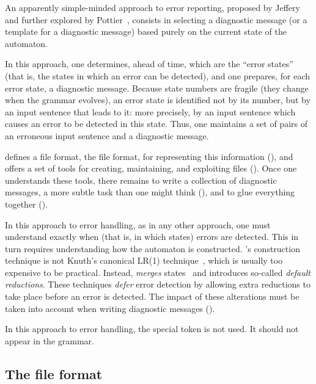 \documentclass[onecolumn,11pt,nocopyrightspace,preprint]{sigplanconf}
\begin{document}
An apparently simple-minded approach to error reporting,
proposed by Jeffery~\cite{jeffery-03} and further explored by
Pottier~\cite{pottier-reachability-cc-2016}, consists in selecting a diagnostic
message (or a template for a diagnostic message) based purely on the current
state of the automaton.

In this approach, one determines, ahead of time, which are the ``error
states'' (that is, the states in which an error can be detected), and one
prepares, for each error state, a diagnostic message. Because state numbers
are fragile (they change when the grammar evolves), an error state is
identified not by its number, but by an input sentence that leads to it: more
precisely, by an input sentence which causes an error to be detected in this
state. Thus, one maintains a set of pairs of an erroneous input sentence and a
diagnostic message.

\menhir defines a file format, the \messages file format,
for representing this information (), and offers a
set of tools for creating, maintaining, and exploiting \messages files
(). Once one understands these tools, there remains
to write a collection of diagnostic messages, a more subtle task than one
might think (), and to glue everything together
().

In this approach to error handling, as in any other approach, one must
understand exactly when (that is, in which states) errors are detected.
This in turn requires understanding how the automaton is constructed.
\menhir's construction technique is not Knuth's canonical LR(1)
technique~\cite{knuth-lr-65}, which is usually too expensive to be practical.
Instead, \menhir \emph{merges} states~\cite{pager-77} and introduces so-called \emph{default
reductions}. These techniques \emph{defer} error detection by allowing
extra reductions to take place before an error is detected.
The impact of these alterations must be taken into account when writing
diagnostic messages ().

In this approach to error handling, the special \error token is not used. It
should not appear in the grammar.


\subsection{The \messages file format}
\label{sec:messages:format}
\end{document}
